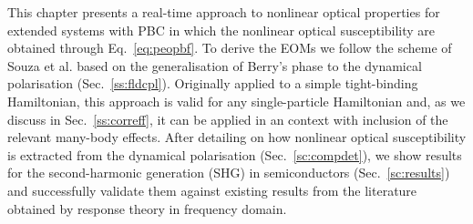 This chapter presents a real-time \ai approach to nonlinear optical properties for extended systems with PBC in which the nonlinear optical susceptibility are obtained through Eq.~\eqref{eq:peopbf}. To derive the EOMs we follow the scheme of Souza et al.\cite{souza_prb} based on the generalisation of Berry's phase to the dynamical polarisation (Sec.~\ref{ss:fldcpl}). Originally applied to a simple tight-binding Hamiltonian, this approach is valid for any single-particle Hamiltonian and, as we discuss in Sec.~\ref{ss:correff}, it can be applied in an \ai context with inclusion of the relevant many-body effects. After detailing on how nonlinear optical susceptibility is extracted from the dynamical polarisation (Sec.~\ref{sc:compdet}), we show results for the second-harmonic generation (SHG) in semiconductors (Sec.~\ref{sc:results}) and successfully validate them against existing results from the literature obtained by response theory in frequency domain.   
   



